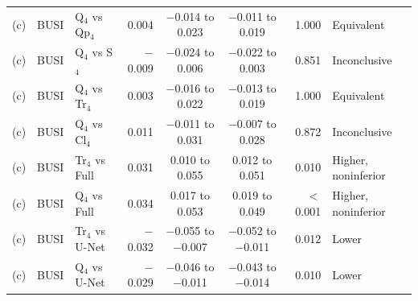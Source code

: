 \begin{longtable}{@{}lllrccrl@{}}
\midrule
(c) & BUSI & Q$_4$ vs Qp$_4$ & 0.004 & $-$0.014 to 0.023 & $-$0.011 to 0.019 & 1.000 & Equivalent \\
(c) & BUSI & Q$_4$ vs S$_4$ & $-$0.009 & $-$0.024 to 0.006 & $-$0.022 to 0.003 & 0.851 & Inconclusive \\
(c) & BUSI & Q$_4$ vs Tr$_4$ & 0.003 & $-$0.016 to 0.022 & $-$0.013 to 0.019 & 1.000 & Equivalent \\
(c) & BUSI & Q$_4$ vs Cl$_4$ & 0.011 & $-$0.011 to 0.031 & $-$0.007 to 0.028 & 0.872 & Inconclusive \\
\midrule
(c) & BUSI & Tr$_4$ vs Full & 0.031 & 0.010 to 0.055 & 0.012 to 0.051 & 0.010 & Higher, noninferior \\
(c) & BUSI & Q$_4$ vs Full & 0.034 & 0.017 to 0.053 & 0.019 to 0.049 & $<$0.001 & Higher, noninferior \\
(c) & BUSI & Tr$_4$ vs U-Net & $-$0.032 & $-$0.055 to $-$0.007 & $-$0.052 to $-$0.011 & 0.012 & Lower \\
(c) & BUSI & Q$_4$ vs U-Net & $-$0.029 & $-$0.046 to $-$0.011 & $-$0.043 to $-$0.014 & 0.010 & Lower \\
\bottomrule
\end{longtable}
